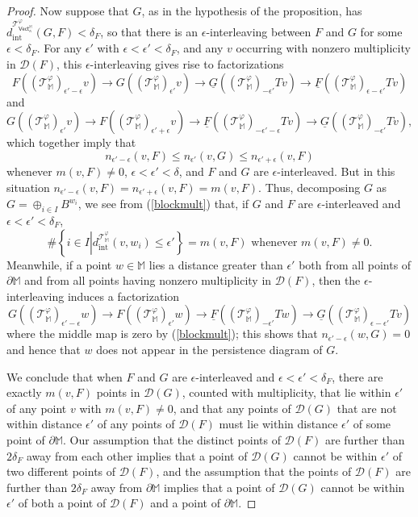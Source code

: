 \documentclass[11pt]{amsart}
\theoremstyle{definition}
\theoremstyle{remark}
\numberwithin{equation}{section}
\def\ep{\epsilon}
\begin{document}
\begin{proof}
	Now suppose that $G$, as in the hypothesis of the proposition, has $d_{\mathrm{int}}^{\mathcal{T}_{\mathsf{Vect}_{\kappa}^{\mathbb{M}}}^{\varphi}}(G,F)< \delta_F$, so that there is an $\ep$-interleaving between $F$ and $G$ for some $\ep<\delta_F$.  For any $\ep'$ with $\ep<\ep'<\delta_F$, and any $v$ occurring with nonzero multiplicity in $\mathcal{D}(F)$, this $\ep$-interleaving gives rise to factorizations 
	\[ F((\mathcal{T}_{\mathbb{M}}^{\varphi})_{\ep'-\ep}v)\to G((\mathcal{T}_{\mathbb{M}}^{\varphi})_{\ep'}v)\to \underline{G}((\mathcal{T}_{\mathbb{M}}^{\varphi})_{-\ep'}Tv)\to \underline{F}((\mathcal{T}_{\mathbb{M}}^{\varphi})_{\ep-\ep'}Tv) \] and \[  G((\mathcal{T}_{\mathbb{M}}^{\varphi})_{\ep'}v)\to F((\mathcal{T}_{\mathbb{M}}^{\varphi})_{\ep'+\ep}v)\to \underline{F}((\mathcal{T}_{\mathbb{M}}^{\varphi})_{-\ep'-\ep}Tv)\to  \underline{G}((\mathcal{T}_{\mathbb{M}}^{\varphi})_{-\ep'}Tv), \] which together imply that \[ n_{\ep'-\ep}(v,F)\leq n_{\ep'}(v,G)\leq n_{\ep'+\ep}(v,F)\]  whenever $m(v,F)\neq 0$, $\ep<\ep'<\delta$, and $F$ and $G$ are $\ep$-interleaved.  But in this situation $n_{\ep'-\ep}(v,F)=n_{\ep'+\ep}(v,F)=m(v,F)$.  Thus, decomposing $G$ as $G=\oplus_{i\in I}B^{w_i}$, we see from (\ref{blockmult}) that, if $G$ and $F$ are $\ep$-interleaved and $\ep<\ep'<\delta_F$, \[ \#\left\{i\in I\left|d_{\mathrm{int}}^{\mathcal{T}_{\mathbb{M}}^{\varphi}}(v,w_i)\leq \ep'   \right. \right\}=m(v,F)\mbox{ whenever }m(v,F)\neq 0.  \]  Meanwhile, if a point $w\in\mathbb{M}$ lies a distance greater than $\ep'$ both from all points of $\partial\mathbb{M}$ and from  all points having nonzero multiplicity in $\mathcal{D}(F)$, then the $\ep$-interleaving induces a factorization \[  G((\mathcal{T}_{\mathbb{M}}^{\varphi})_{\ep'-\ep}w)\to F((\mathcal{T}_{\mathbb{M}}^{\varphi})_{\ep'}w)\to \underline{F}((\mathcal{T}_{\mathbb{M}}^{\varphi})_{-\ep'}Tw)\to \underline{G}((\mathcal{T}_{\mathbb{M}}^{\varphi})_{\ep-\ep'}Tv)  \] where the middle map is zero by (\ref{blockmult}); this shows that $n_{\ep'-\ep}(w,G)=0$ and hence that $w$ does not appear in the persistence diagram of $G$.
	
	We conclude that when $F$ and $G$ are $\ep$-interleaved and $\ep<\ep'<\delta_F$, there are exactly $m(v,F)$ points in $\mathcal{D}(G)$, counted with multiplicity, that lie within $\ep'$ of any point $v$ with $m(v,F)\neq 0$, and that any points of $\mathcal{D}(G)$ that are not within distance $\ep'$ of any points of $\mathcal{D}(F)$ must lie within distance $\ep'$ of some point of $\partial\mathbb{M}$.  Our assumption that the distinct points of $\mathcal{D}(F)$ are further than $2\delta_F$ away from each other implies that a point of $\mathcal{D}(G)$ cannot be within $\ep'$ of two different points of $\mathcal{D}(F)$, and the assumption that the points of $\mathcal{D}(F)$ are further than $2\delta_F$ away from $\partial\mathbb{M}$ implies that   a point of $\mathcal{D}(G)$ cannot be within $\ep'$ of both a point of $\mathcal{D}(F)$ and a point of $\partial\mathbb{M}$.
	

\end{proof}
\end{document}
